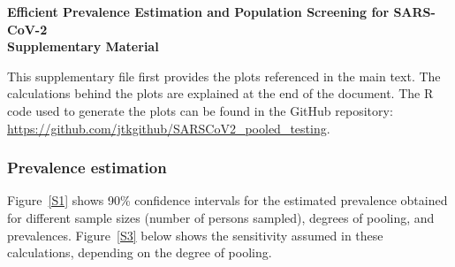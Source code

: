 \documentclass[10pt]{article}
\begin{document}
\begin{center}
{\large \bf  Efficient Prevalence Estimation and Population Screening for SARS-CoV-2\\\vspace*{0.4cm} Supplementary Material  }                           
\end{center}


\vspace*{8mm}

This supplementary file first provides the plots referenced in the main text. The calculations behind the plots are explained at the end of the document. The R code used to generate the plots can be found in the GitHub repository: 
\url{https://github.com/jtkgithub/SARSCoV2_pooled_testing}.    

\subsubsection*{Prevalence estimation}

Figure~\ref{S1} shows 90\% confidence intervals for the estimated prevalence obtained for different sample sizes (number of persons sampled), degrees of pooling, and prevalences. Figure~\ref{S3} below shows the sensitivity assumed in these calculations, depending on the degree of pooling.
 
\end{document}
